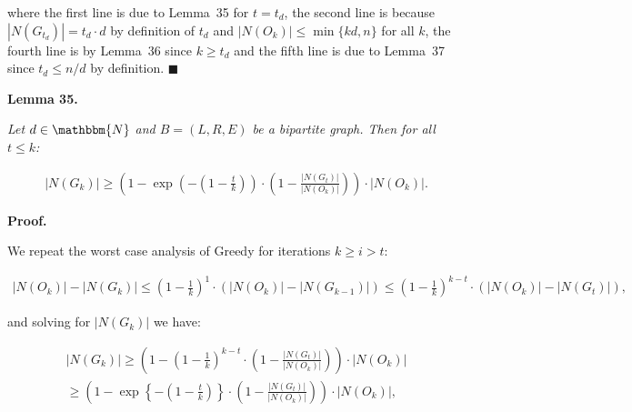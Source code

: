 \documentclass[10pt,a4paper]{article}
\begin{document}
where the first line is due to Lemma 35 for $t=t_{d}$, the second line is because $|N(G_{t_{d}})|=t_{d}\cdot d$ by definition of $t_{d}$ and $|N(O_{k})|\leq\min\{kd,n\}$ for all $k$, the fourth line is by Lemma 36 since $k\geq t_{d}$ and the fifth line is due to Lemma 37 since $t_{d}\leq n/d$ by definition.
\ensuremath{\blacksquare}\par






\par\medskip\noindent\textbf{\textbf{Lemma 35}\textbf{.}}\par



\emph{Let $d\in\mathbbm{N}$ and $B=(L,R,E)$ be a bipartite graph.
Then for all $t\leq k$:}\par


\[\begin{gathered}
|N(G_{k})|\geq\left(1-\exp\left(-\left(1-\frac{t}{k}\right)\right)\cdot\left(1-\frac{|N(G_{t})|}{|N(O_{k})|}\right)\right)\cdot|N(O_{k})|.
\end{gathered}\]






\par\medskip\noindent\textbf{Proof.}\par



We repeat the worst case analysis of Greedy for iterations $k\geq i>t$:\par


\[\begin{gathered}
\displaystyle|N(O_{k})|-|N(G_{k})|\leq\left(1-\frac{1}{k}\right)^{1}\cdot\left(|N(O_{k})|-|N(G_{k-1})|\right)\leq\left(1-\frac{1}{k}\right)^{k-t}\cdot\left(|N(O_{k})|-|N(G_{t})|\right),
\end{gathered}\]


and solving for $|N(G_{k})|$ we have:\par


\[\begin{gathered}
\displaystyle|N(G_{k})| \displaystyle\geq\left(1-\left(1-\frac{1}{k}\right)^{k-t}\cdot\left(1-\frac{|N(G_{t})|}{|N(O_{k})|}\right)\right)\cdot|N(O_{k})| \\
\displaystyle\geq\left(1-\exp\left\{-\left(1-\frac{t}{k}\right)\right\}\cdot\left(1-\frac{|N(G_{t})|}{|N(O_{k})|}\right)\right)\cdot|N(O_{k})|,
\end{gathered}\]
\end{document}
